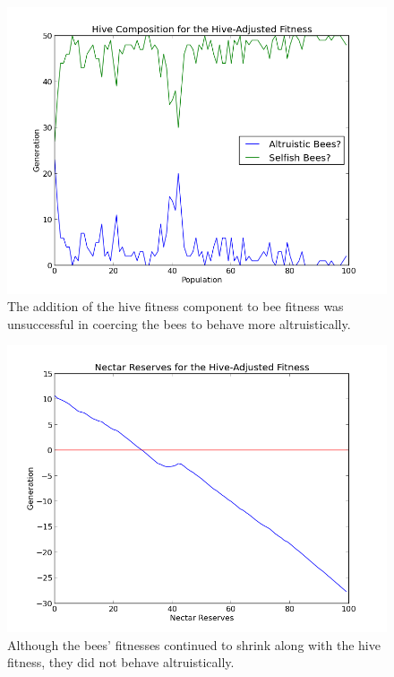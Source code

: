 \documentclass[11pt, letter]{article}
\begin{document}
			\begin{figure}[tbph!]
				\begin{center}
					\includegraphics[scale=.5]{results/hive_fitness_comp.png}
				\end{center}
				\caption{The addition of the hive fitness component to bee fitness was unsuccessful in coercing the bees to behave more altruistically.}
				\label{fig:hive_fitness_composition}
			\end{figure}

			\begin{figure}[tbph!]
				\begin{center}
					\includegraphics[scale=.5]{results/hive_fitness_res.png}
				\end{center}
				\caption{Although the bees' fitnesses continued to shrink along with the hive fitness, they did not behave altruistically.}
				\label{fig:hive_fitness_reserves}
			\end{figure}
\end{document}

